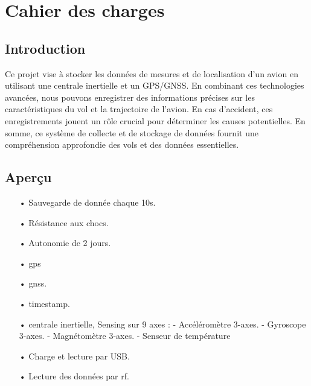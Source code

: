 \section{Cahier des charges}
\noindent
\begin{minipage}[t]{.5\textwidth} %
	\subsection{Introduction}
	Ce projet vise à stocker les données de mesures et de localisation d'un avion en utilisant une centrale inertielle et un GPS/GNSS. En combinant ces technologies avancées, nous pouvons enregistrer des informations précises sur les caractéristiques du vol et la trajectoire de l'avion. En cas d'accident, ces enregistrements jouent un rôle crucial pour déterminer les causes potentielles. En somme, ce système de collecte et de stockage de données fournit une compréhension approfondie des vols et des données essentielles.
\end{minipage} %
\begin{minipage}[t]{.5\textwidth} %
	\raggedleft
	\subsection{Aperçu}
	\begin{itemize}
		\item[•]	Sauvegarde de donnée chaque 10s.
		\item[•]	Résistance aux chocs.
		\item[•]	Autonomie de 2 jours.
		\item[•]	\Gls{gps}
		\item[•]	\Gls{gnss}.
		\item[•]	\gls{timestamp}.
		\item[•]	\gls{centrale inertielle}, Sensing sur 9 axes :
		\subitem- Accéléromètre 3-axes. 
		\subitem-	Gyroscope 3-axes.
		\subitem-	Magnétomètre 3-axes. 
		\subitem-	Senseur de température
		\item[•] Charge et lecture par USB.
		\item[•] Lecture des données par \gls{rf}.
	\end{itemize}
\end{minipage}


